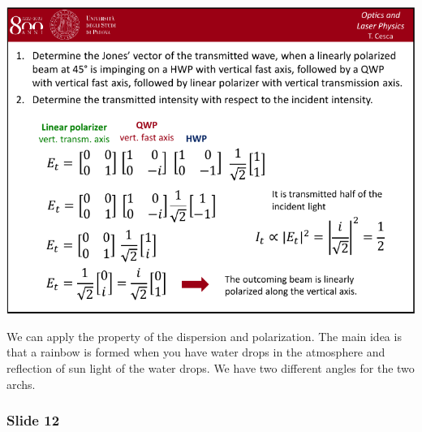 \documentclass[../main/main.tex]{subfiles}
\begin{document}
\begin{minipage}[]{0.5\linewidth}
\centering
\includegraphics[page=11,width=1\textwidth]{../lessons/pdf_file/04_lecture.pdf}
\end{minipage}
\hspace{0.3cm}\vspace{0.3cm}
\begin{minipage}[c]{0.47\linewidth}

We can apply the property of the dispersion and polarization. The main idea is that a rainbow is formed when you have water drops in the atmosphere and reflection of sun light of the water drops. We have two different angles for the two archs.

\end{minipage}

\subsubsection*{Slide 12}
\end{document}
